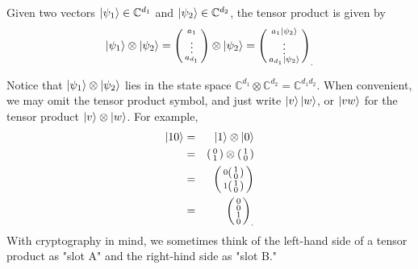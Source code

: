 \begin{example}
Given two vectors $\ket{\psi_1}\in\mathbb{C}^{d_1}$ and $\ket{\psi_2}\in\mathbb{C}^{d_2}$, the tensor product is given by
\begin{equation}
\ket{\psi_1} \otimes\ket{\psi_2} = \left(\begin{smallmatrix} a_1\\ \vdots \\ a_{d_1}\end{smallmatrix}\right) \otimes \ket{\psi_2} = {\left(\begin{smallmatrix} a_1\ket{\psi_2}\\ \vdots \\a_{d_1}\ket{\psi_2}\end{smallmatrix}\right)}_.
\end{equation}
\end{example}
Notice that $\ket{\psi_1} \otimes\ket{\psi_2}$ lies in the state space $\mathbb{C}^{d_1}\otimes\mathbb{C}^{d_2}={\mathbb{C}}^{d_1 d_2}.$  When convenient, we may omit the tensor product symbol, and just write $\ket{v}\ket{w}$, or $\ket{vw}$ for the tensor product $\ket{v} \otimes \ket{w}$. For example, 
\begin{eqnarray*}
\ket{10}&=&\ket{1} \otimes \ket{0}\\
&=& \left(\begin{smallmatrix}0\\1\end{smallmatrix}\right) \otimes \left(\begin{smallmatrix}1\\0\end{smallmatrix}\right)\\ 
&=& \left(\begin{smallmatrix}
0\left(\begin{smallmatrix}1\\0\end{smallmatrix}\right)\\
1\left(\begin{smallmatrix}1\\0\end{smallmatrix}\right)\end{smallmatrix}\right)\\
&=&{\left(\begin{smallmatrix}
0\\
0\\
1\\
0\end{smallmatrix}\right)}_.
\end{eqnarray*}
With cryptography in mind, we sometimes think of the left-hand side of a tensor product as "slot A" and the right-hind side as "slot B."


